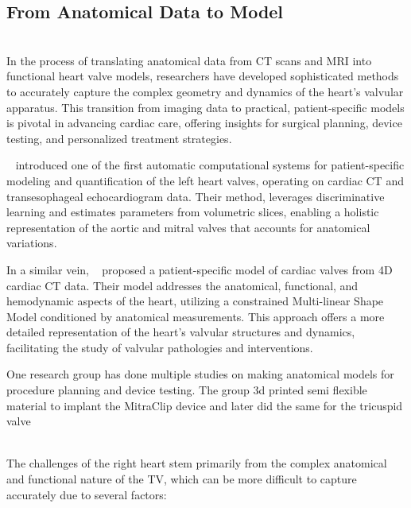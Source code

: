 \subsection{From Anatomical Data to Model}
\\
In the process of translating anatomical data from \gls{CT} scans and \gls{MRI} into functional heart valve models, researchers have developed sophisticated methods to accurately capture the complex geometry and dynamics of the heart's valvular apparatus. This transition from imaging data to practical, patient-specific models is pivotal in advancing cardiac care, offering insights for surgical planning, device testing, and personalized treatment strategies.

~ introduced one of the first automatic computational systems for patient-specific modeling and quantification of the left heart valves, operating on cardiac \gls{CT} and transesophageal echocardiogram data. Their method, leverages discriminative learning and estimates  parameters from volumetric slices, enabling a holistic representation of the aortic and mitral valves that accounts for anatomical variations.

In a similar vein, ~ proposed a patient-specific model of cardiac valves from 4D cardiac \gls{CT} data. Their model addresses the anatomical, functional, and hemodynamic aspects of the heart, utilizing a constrained Multi-linear Shape Model conditioned by anatomical measurements. This approach offers a more detailed representation of the heart's valvular structures and dynamics, facilitating the study of valvular pathologies and interventions.

One research group has done multiple studies on making anatomical models for procedure planning and device testing. The group 3d printed semi flexible material to implant the MitraClip device and later did the same for the tricuspid valve 

\\
The challenges of the right heart stem primarily from the complex anatomical and functional nature of the \gls{TV}, which can be more difficult to capture accurately due to several factors:

